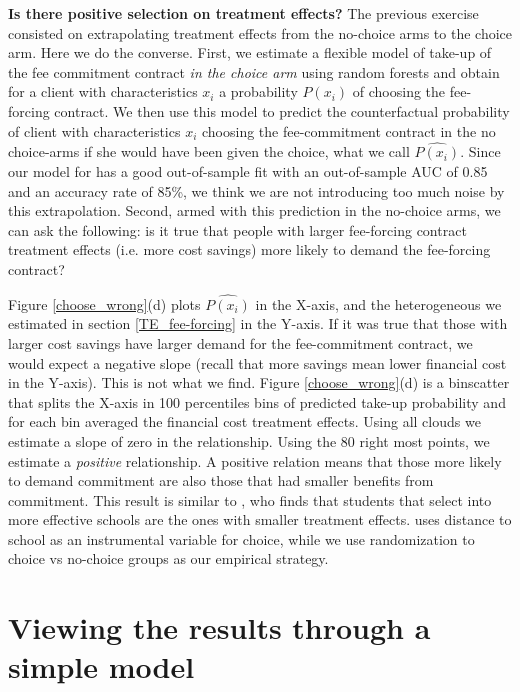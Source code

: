 \documentclass[11pt]{article}
\begin{document}
    
\vspace{.2in}
\noindent \textbf{Is there positive selection on treatment effects?} The previous exercise consisted on extrapolating treatment effects from the no-choice arms to the choice arm. Here we do the converse. First, we estimate a flexible model of take-up of the fee commitment contract \textit{in the choice arm} using random forests and obtain for a client with characteristics $x_i$ a probability $P(x_i)$ of choosing the fee-forcing contract. We then use this model to predict the counterfactual probability of client with characteristics $x_i$ choosing the fee-commitment contract in the no choice-arms if she would have been given the choice, what we call $\widehat{P(x_i)}$. Since our model for has a good out-of-sample fit with an out-of-sample AUC of 0.85 and an accuracy rate of 85\%, we think we are not introducing too much noise by this extrapolation. Second, armed with this prediction in the no-choice arms, we can ask the following: is it true that people with larger fee-forcing contract treatment effects (i.e. more cost savings) more likely to demand the fee-forcing contract? 

Figure \ref{choose_wrong}(d) plots $\widehat{P(x_i)}$ in the X-axis, and the heterogeneous we estimated in section \ref{TE_fee-forcing} in the Y-axis. If it was true that those with larger cost savings have larger demand for the fee-commitment contract, we would expect a negative slope (recall that more savings mean lower financial cost in the Y-axis). This is not what we find. Figure \ref{choose_wrong}(d) is a binscatter that splits the X-axis in 100 percentiles bins of predicted take-up probability and for each bin averaged the financial cost treatment effects. Using all clouds we estimate a slope of zero in the relationship. Using the 80 right most points, we estimate a \textit{positive} relationship. A positive relation means that those more likely to demand commitment are also those that had smaller benefits from commitment. This result is similar to \cite{Walters}, who finds that students that select into more effective schools are the ones with smaller treatment effects. \cite{Walters} uses distance to school as an instrumental variable for choice, while we use randomization to choice vs no-choice groups as our empirical strategy.


\section{Viewing the results through a simple model} \label{model}
\end{document}

